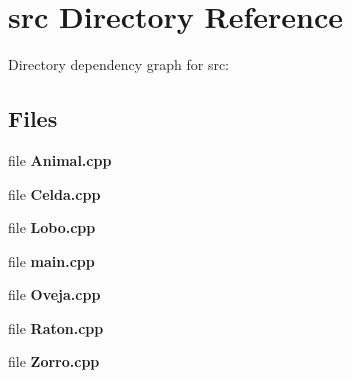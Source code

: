 \section{src Directory Reference}
\label{dir_68267d1309a1af8e8297ef4c3efbcdba}
Directory dependency graph for src\+:
\subsection*{Files}
\begin{DoxyCompactItemize}
\item 
file {\bfseries Animal.\+cpp}
\item 
file {\bfseries Celda.\+cpp}
\item 
file {\bfseries Lobo.\+cpp}
\item 
file {\bfseries main.\+cpp}
\item 
file {\bfseries Oveja.\+cpp}
\item 
file {\bfseries Raton.\+cpp}
\item 
file {\bfseries Zorro.\+cpp}
\end{DoxyCompactItemize}
